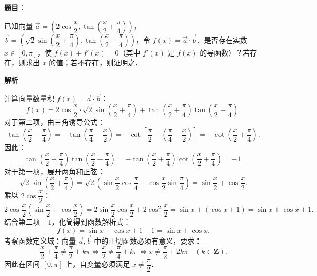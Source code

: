 \begin{answer}


\end{answer}
\begin{answer}

\textbf{题目}：

已知向量 $\vec{a} = \left(2\cos\dfrac{x}{2}, \tan\left(\dfrac{x}{2} + \dfrac{\pi}{4}\right)\right)$，$\vec{b} = \left(\sqrt{2}\sin\left(\dfrac{x}{2} + \dfrac{\pi}{4}\right), \tan\left(\dfrac{x}{2} - \dfrac{\pi}{4}\right)\right)$，令 $f(x) = \vec{a} \cdot \vec{b}$．是否存在实数 $x \in [0, \pi]$，使 $f(x) + f'(x) = 0$（其中 $f'(x)$ 是 $f(x)$ 的导函数）？若存在，则求出 $x$ 的值；若不存在，则证明之．

\textbf{解析}

计算向量数量积 $f(x) = \vec{a} \cdot \vec{b}$：
\nopagebreak[4]
\[
f(x) = 2\cos\dfrac{x}{2} \cdot \sqrt{2}\sin\left(\dfrac{x}{2} + \dfrac{\pi}{4}\right) + \tan\left(\dfrac{x}{2} + \dfrac{\pi}{4}\right)\tan\left(\dfrac{x}{2} - \dfrac{\pi}{4}\right).
\]
对于第二项，由三角诱导公式：
\nopagebreak[4]
\[
\tan\left(\dfrac{x}{2} - \dfrac{\pi}{4}\right) = -\tan\left(\dfrac{\pi}{4} - \dfrac{x}{2}\right) = -\cot\left[\dfrac{\pi}{2} - \left(\dfrac{\pi}{4} - \dfrac{x}{2}\right)\right] = -\cot\left(\dfrac{x}{2} + \dfrac{\pi}{4}\right).
\]
因此：
\nopagebreak[4]
\[
\tan\left(\dfrac{x}{2} + \dfrac{\pi}{4}\right)\tan\left(\dfrac{x}{2} - \dfrac{\pi}{4}\right) = -\tan\left(\dfrac{x}{2} + \dfrac{\pi}{4}\right)\cot\left(\dfrac{x}{2} + \dfrac{\pi}{4}\right) = -1.
\]
对于第一项，展开两角和正弦：
\nopagebreak[4]
\[
\sqrt{2}\sin\left(\dfrac{x}{2} + \dfrac{\pi}{4}\right) = \sqrt{2}\left(\sin\dfrac{x}{2}\cos\dfrac{\pi}{4} + \cos\dfrac{x}{2}\sin\dfrac{\pi}{4}\right) = \sin\dfrac{x}{2} + \cos\dfrac{x}{2}.
\]
乘以 $2\cos\dfrac{x}{2}$：
\nopagebreak[4]
\[
2\cos\dfrac{x}{2}\left(\sin\dfrac{x}{2} + \cos\dfrac{x}{2}\right) = 2\sin\dfrac{x}{2}\cos\dfrac{x}{2} + 2\cos^2\dfrac{x}{2} = \sin x + (\cos x + 1) = \sin x + \cos x + 1.
\]
结合第二项 $-1$，化简得到函数解析式：
\nopagebreak[4]
\[
f(x) = \sin x + \cos x + 1 - 1 = \sin x + \cos x.
\]
考察函数定义域：向量 $\vec{a}, \vec{b}$ 中的正切函数必须有意义，要求：
\nopagebreak[4]
\[
\dfrac{x}{2} \pm \dfrac{\pi}{4} \neq \dfrac{\pi}{2} + k\pi \iff \dfrac{x}{2} \neq \dfrac{\pi}{4} + k\pi \iff x \neq \dfrac{\pi}{2} + 2k\pi \quad (k \in \mathbf{Z}).
\]
因此在区间 $[0, \pi]$ 上，自变量必须满足 $x \neq \dfrac{\pi}{2}$．


\end{answer}
